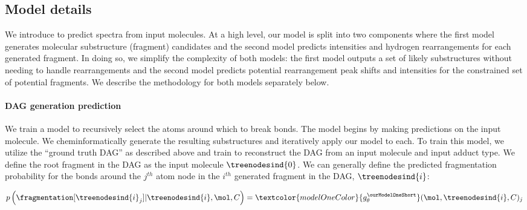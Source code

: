 \documentclass[journal=jcim,manuscript=article]{achemso}
\begin{document}
\subsection{Model details}
\label{sec:methods_model}

We introduce \ourModel to predict spectra from input molecules. At a high level, our model is split into two components where the first model generates molecular substructure (fragment) candidates and the second model predicts intensities and hydrogen rearrangements for each generated fragment.  In doing so, we simplify the complexity of both models: the first model outputs a set of likely substructures without needing to handle rearrangements and the second model predicts potential rearrangement peak shifts and intensities for the constrained set of potential fragments. We describe the methodology for both models separately below. 

\paragraph{DAG generation prediction} 
We train a model to recursively select the atoms around which to break bonds. The model begins by making predictions on the input molecule. We cheminformatically generate the resulting substructures and iteratively apply our model to each. To train this model, we utilize the ``ground truth DAG'' as described above and train \ourModel \ourModelOneShort to reconstruct the DAG from an input molecule and input adduct type. We define the root fragment in the DAG as the input molecule $\treenodesind{0}$. We can generally define the predicted fragmentation probability for the bonds around the $j^{th}$ atom node in the $i^{th}$ generated fragment in the DAG, $\treenodesind{i}$:

\begin{equation}
p\left(\fragmentation[\treenodesind{i}_j] | \treenodesind{i}, \mol, C\right) = \textcolor{modelOneColor}{g_{\theta}^{\ourModelOneShort}}(\mol,\treenodesind{i}, C)_j  
\end{equation}
\end{document}
